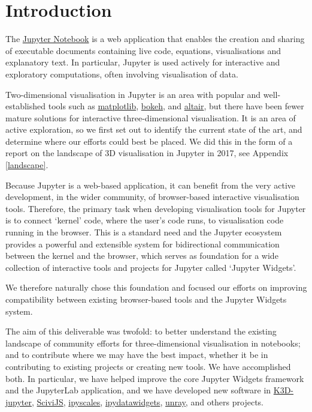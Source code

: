 \documentclass{deliverablereport}
\author{Benjamin Ragan-Kelley, Vidar Tonaas Fauske, Marcin Kostur}
\begin{document}
\maketitle
\tableofcontents


\section{Introduction}

The \href{https://jupyter.org}{Jupyter Notebook} is a web application
that enables the creation and sharing of executable documents
containing live code, equations, visualisations and explanatory text.
In particular, Jupyter is used actively for interactive and exploratory computations,
often involving visualisation of data.

Two-dimensional visualisation in Jupyter is an area with popular and well-established tools
such as \href{https://matplotlib.org}{matplotlib}, \href{https://bokeh.pydata.org/}{bokeh}, and \href{https://altair-viz.github.io}{altair},
but there have been fewer mature solutions for interactive three-dimensional visualisation.
It is an area of active exploration,
so we first set out to identify the current state of the art,
and determine where our efforts could best be placed.
We did this in the form of a report on the landscape of 3D
visualisation in Jupyter in 2017, see Appendix \ref{landscape}.

Because Jupyter is a web-based application, it can benefit from the
very active development, in the wider community, of browser-based
interactive visualisation tools. Therefore, the primary task when
developing visualisation tools for Jupyter is to connect `kernel'
code, where the user's code runs, to visualisation code running in the
browser. This is a standard need and the Jupyter ecosystem provides a
powerful and extensible system for bidirectional communication between
the kernel and the browser, which serves as foundation for a wide
collection of interactive tools and projects for Jupyter called
`Jupyter Widgets'.

We therefore naturally chose this foundation and focused our efforts
on improving compatibility between existing browser-based tools and
the Jupyter Widgets system.

The aim of this deliverable was twofold: to better
understand the existing landscape of community efforts for three-dimensional
visualisation in notebooks; and to contribute where we may have the best
impact, whether it be in contributing to existing projects or creating new
tools. We have accomplished both. In particular, we have helped improve the
core Jupyter Widgets framework and the JupyterLab application, and we have
developed new software in
\href{https://github.com/K3D-tools/K3D-jupyter}{K3D-jupyter},
\href{https://demo.logilab.fr/SciviJS/}{SciviJS},
\href{https://github.com/vidartf/ipyscales}{ipyscales},
\href{https://github.com/vidartf/ipydatawidgets}{ipydatawidgets},
\href{https://github.com/vidartf/unray}{unray},
and others projects.
\end{document}
